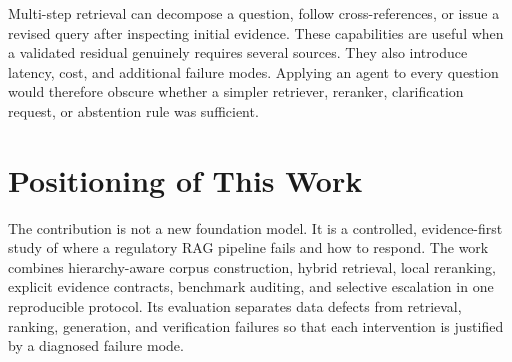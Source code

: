 Multi-step retrieval can decompose a question, follow cross-references, or issue a revised query after inspecting initial evidence. These capabilities are useful when a validated residual genuinely requires several sources. They also introduce latency, cost, and additional failure modes. Applying an agent to every question would therefore obscure whether a simpler retriever, reranker, clarification request, or abstention rule was sufficient.

\section{Positioning of This Work}

The contribution is not a new foundation model. It is a controlled, evidence-first study of where a regulatory RAG pipeline fails and how to respond. The work combines hierarchy-aware corpus construction, hybrid retrieval, local reranking, explicit evidence contracts, benchmark auditing, and selective escalation in one reproducible protocol. Its evaluation separates data defects from retrieval, ranking, generation, and verification failures so that each intervention is justified by a diagnosed failure mode.

